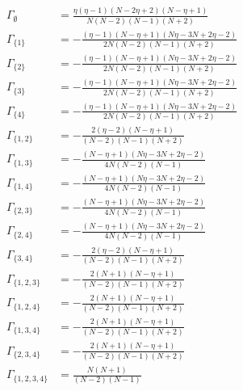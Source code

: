 \documentclass[11pt]{article}
\begin{document}
\begin{align*}
  \Gamma_{\emptyset} &= \frac{\eta \left(\eta - 1\right) \left(N - 2 \eta + 2\right) \left(N - \eta + 1\right)}{N \left(N - 2\right) \left(N - 1\right) \left(N + 2\right)} \\
  \Gamma_{\{1\}} &= - \frac{\left(\eta - 1\right) \left(N - \eta + 1\right) \left(N \eta - 3 N + 2 \eta - 2\right)}{2 N \left(N - 2\right) \left(N - 1\right) \left(N + 2\right)} \\
  \Gamma_{\{2\}} &= - \frac{\left(\eta - 1\right) \left(N - \eta + 1\right) \left(N \eta - 3 N + 2 \eta - 2\right)}{2 N \left(N - 2\right) \left(N - 1\right) \left(N + 2\right)} \\
  \Gamma_{\{3\}} &= - \frac{\left(\eta - 1\right) \left(N - \eta + 1\right) \left(N \eta - 3 N + 2 \eta - 2\right)}{2 N \left(N - 2\right) \left(N - 1\right) \left(N + 2\right)} \\
  \Gamma_{\{4\}} &= - \frac{\left(\eta - 1\right) \left(N - \eta + 1\right) \left(N \eta - 3 N + 2 \eta - 2\right)}{2 N \left(N - 2\right) \left(N - 1\right) \left(N + 2\right)} \\
  \Gamma_{\{1,2\}} &= - \frac{2 \left(\eta - 2\right) \left(N - \eta + 1\right)}{\left(N - 2\right) \left(N - 1\right) \left(N + 2\right)} \\
  \Gamma_{\{1,3\}} &= - \frac{\left(N - \eta + 1\right) \left(N \eta - 3 N + 2 \eta - 2\right)}{4 N \left(N - 2\right) \left(N - 1\right)} \\
  \Gamma_{\{1,4\}} &= - \frac{\left(N - \eta + 1\right) \left(N \eta - 3 N + 2 \eta - 2\right)}{4 N \left(N - 2\right) \left(N - 1\right)} \\
  \Gamma_{\{2,3\}} &= - \frac{\left(N - \eta + 1\right) \left(N \eta - 3 N + 2 \eta - 2\right)}{4 N \left(N - 2\right) \left(N - 1\right)} \\
  \Gamma_{\{2,4\}} &= - \frac{\left(N - \eta + 1\right) \left(N \eta - 3 N + 2 \eta - 2\right)}{4 N \left(N - 2\right) \left(N - 1\right)} \\
  \Gamma_{\{3,4\}} &= - \frac{2 \left(\eta - 2\right) \left(N - \eta + 1\right)}{\left(N - 2\right) \left(N - 1\right) \left(N + 2\right)} \\
  \Gamma_{\{1,2,3\}} &= - \frac{2 \left(N + 1\right) \left(N - \eta + 1\right)}{\left(N - 2\right) \left(N - 1\right) \left(N + 2\right)} \\
  \Gamma_{\{1,2,4\}} &= - \frac{2 \left(N + 1\right) \left(N - \eta + 1\right)}{\left(N - 2\right) \left(N - 1\right) \left(N + 2\right)} \\
  \Gamma_{\{1,3,4\}} &= - \frac{2 \left(N + 1\right) \left(N - \eta + 1\right)}{\left(N - 2\right) \left(N - 1\right) \left(N + 2\right)} \\
  \Gamma_{\{2,3,4\}} &= - \frac{2 \left(N + 1\right) \left(N - \eta + 1\right)}{\left(N - 2\right) \left(N - 1\right) \left(N + 2\right)} \\
  \Gamma_{\{1,2,3,4\}} &= \frac{N \left(N + 1\right)}{\left(N - 2\right) \left(N - 1\right)} 
\end{align*}
\end{document}
